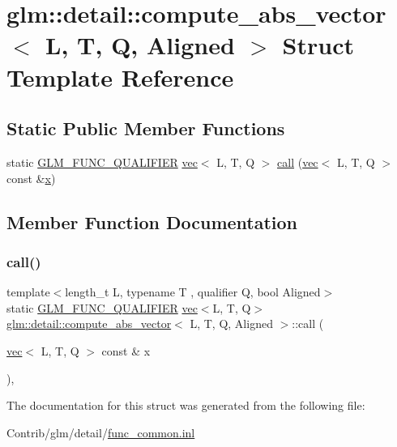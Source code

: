 \hypertarget{structglm_1_1detail_1_1compute__abs__vector}{}\section{glm\+:\+:detail\+:\+:compute\+\_\+abs\+\_\+vector$<$ L, T, Q, Aligned $>$ Struct Template Reference}
\label{structglm_1_1detail_1_1compute__abs__vector}
\subsection*{Static Public Member Functions}
\begin{DoxyCompactItemize}
\item 
static \mbox{\hyperlink{setup_8hpp_a33fdea6f91c5f834105f7415e2a64407}{G\+L\+M\+\_\+\+F\+U\+N\+C\+\_\+\+Q\+U\+A\+L\+I\+F\+I\+ER}} \mbox{\hyperlink{structglm_1_1vec}{vec}}$<$ L, T, Q $>$ \mbox{\hyperlink{structglm_1_1detail_1_1compute__abs__vector_a888d9125f1091c659f0135bafdbe6c19}{call}} (\mbox{\hyperlink{structglm_1_1vec}{vec}}$<$ L, T, Q $>$ const \&\mbox{\hyperlink{_s_d_l__opengl_8h_ad0e63d0edcdbd3d79554076bf309fd47}{x}})
\end{DoxyCompactItemize}


\subsection{Member Function Documentation}
\mbox{\label{structglm_1_1detail_1_1compute__abs__vector_a888d9125f1091c659f0135bafdbe6c19}} 
\subsubsection{\texorpdfstring{call()}{call()}}
{\footnotesize\ttfamily template$<$length\+\_\+t L, typename T , qualifier Q, bool Aligned$>$ \\
static \mbox{\hyperlink{setup_8hpp_a33fdea6f91c5f834105f7415e2a64407}{G\+L\+M\+\_\+\+F\+U\+N\+C\+\_\+\+Q\+U\+A\+L\+I\+F\+I\+ER}} \mbox{\hyperlink{structglm_1_1vec}{vec}}$<$L, T, Q$>$ \mbox{\hyperlink{structglm_1_1detail_1_1compute__abs__vector}{glm\+::detail\+::compute\+\_\+abs\+\_\+vector}}$<$ L, T, Q, Aligned $>$\+::call (\begin{DoxyParamCaption}\item[{\mbox{\hyperlink{structglm_1_1vec}{vec}}$<$ L, T, Q $>$ const \&}]{x }\end{DoxyParamCaption})\hspace{0.3cm}{\ttfamily [inline]}, {\ttfamily [static]}}



The documentation for this struct was generated from the following file\+:\begin{DoxyCompactItemize}
\item 
Contrib/glm/detail/\mbox{\hyperlink{func__common_8inl}{func\+\_\+common.\+inl}}\end{DoxyCompactItemize}

